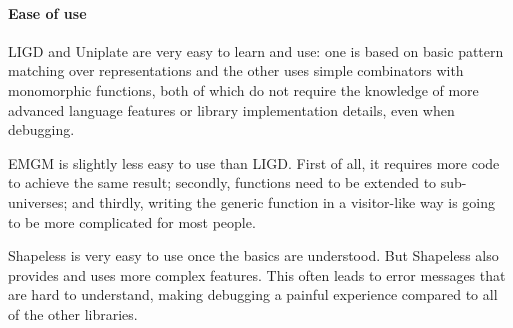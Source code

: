 \paragraph{Ease of use}
LIGD and Uniplate are very easy to learn and use: one is based on basic
pattern matching over representations and the other uses simple combinators
with monomorphic functions, both of which do not require the knowledge of
more advanced language features or library implementation details, even
when debugging.

EMGM is slightly less easy to use than LIGD. First of all, it requires more
code to achieve the same result; secondly, functions need to be extended to
sub-universes; and thirdly, writing the generic function in a visitor-like
way is going to be more complicated for most people.

Shapeless is very easy to use once the basics are understood. But Shapeless
also provides and uses more complex features. This often leads to error messages
that are hard to understand, making debugging a painful experience compared to
all of the other libraries.
